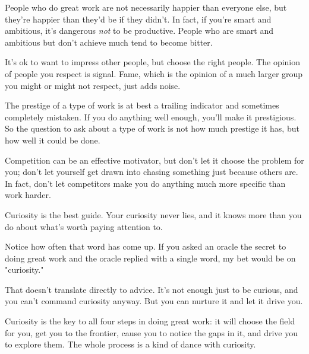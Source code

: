 People who do great work are not necessarily
                  happier than everyone else, but they're happier than they'd be
                  if they didn't. In fact, if you're smart and ambitious, it's
                  dangerous \emph{not} to be productive. People who are smart
                  and ambitious but don't achieve much tend to become bitter.






                  It's ok to want to impress other people, but choose the right
                  people. The opinion of people you respect is signal. Fame,
                  which is the opinion of a much larger group you might or might
                  not respect, just adds noise.

The prestige of a
                  type of work is at best a trailing indicator and sometimes
                  completely mistaken. If you do anything well enough, you'll
                  make it prestigious. So the question to ask about a type of
                  work is not how much prestige it has, but how well it could be
                  done.

Competition can be an effective motivator,
                  but don't let it choose the problem for you; don't let
                  yourself get drawn into chasing something just because others
                  are. In fact, don't let competitors make you do anything much
                  more specific than work harder.

Curiosity is the
                  best guide. Your curiosity never lies, and it knows more than
                  you do about what's worth paying attention to.






                  Notice how often that word has come up. If you asked an oracle
                  the secret to doing great work and the oracle replied with a
                  single word, my bet would be on "curiosity."

That
                  doesn't translate directly to advice. It's not enough just to
                  be curious, and you can't command curiosity anyway. But you
                  can nurture it and let it drive you.

Curiosity is
                  the key to all four steps in doing great work: it will choose
                  the field for you, get you to the frontier, cause you to
                  notice the gaps in it, and drive you to explore them. The
                  whole process is a kind of dance with curiosity.






